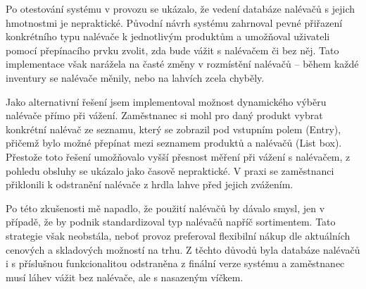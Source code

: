 

Po otestování systému v provozu se ukázalo, že vedení databáze nalévačů s jejich hmotnostmi je nepraktické. Původní návrh systému zahrnoval pevné přiřazení konkrétního typu nalévače k jednotlivým produktům a umožňoval uživateli pomocí přepínacího prvku zvolit, zda bude vážit s nalévačem či bez něj. Tato implementace však narážela na časté změny v rozmístění nalévačů – během každé inventury se nalévače měnily, nebo na lahvích zcela chyběly.

Jako alternativní řešení jsem implementoval možnost dynamického výběru nalévače přímo při vážení. Zaměstnanec si mohl pro daný produkt vybrat konkrétní nalévač ze seznamu, který se zobrazil pod vstupním polem (Entry), přičemž bylo možné přepínat mezi seznamem produktů a nalévačů (List box). Přestože toto řešení umožňovalo vyšší přesnost měření při vážení s nalévačem, z pohledu obsluhy se ukázalo jako časově nepraktické. V praxi se zaměstnanci přiklonili k odstranění nalévače z hrdla lahve před jejich zvážením.

Po této zkušenosti mě napadlo, že použití nalévačů by dávalo smysl, jen v případě, že by podnik standardizoval typ nalévačů napříč sortimentem. Tato strategie však neobstála, neboť provoz preferoval flexibilní nákup dle aktuálních cenových a skladových možností na trhu. Z těchto důvodů byla databáze nalévačů i s příslušnou funkcionalitou odstraněna z finální verze systému a zaměstnanec musí láhev vážit bez nalévače, ale s nasazeným víčkem.


